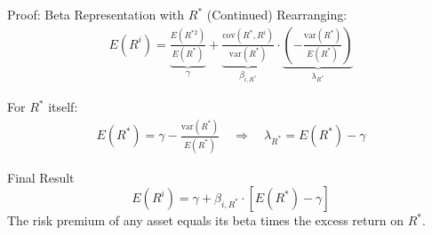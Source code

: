 \documentclass{beamer}
\begin{document}
\begin{frame}{Proof: Beta Representation with $R^*$ (Continued)}
	Rearranging:
	\begin{align*}
		E(R^i) = \underbrace{\frac{E(R^{*2})}{E(R^*)}}_{\gamma} + \underbrace{\frac{\text{cov}(R^*, R^i)}{\text{var}(R^*)}}_{\beta_{i,R^*}} \cdot \underbrace{\left(-\frac{\text{var}(R^*)}{E(R^*)}\right)}_{\lambda_{R^*}}
	\end{align*}
	
	\vspace{5pt}
	For $R^*$ itself:
	\begin{align*}
		E(R^*) = \gamma - \frac{\text{var}(R^*)}{E(R^*)} \quad \Longrightarrow \quad \lambda_{R^*} = E(R^*) - \gamma
	\end{align*}
	
	\vspace{5pt}
	\begin{block}{Final Result}
		\vspace{-5pt}
		\begin{equation*}
			E(R^i) = \gamma + \beta_{i,R^*} \cdot [E(R^*) - \gamma]
		\end{equation*}
		The risk premium of any asset equals its beta times the excess return on $R^*$.
	\end{block}
\end{frame}
\end{document}

